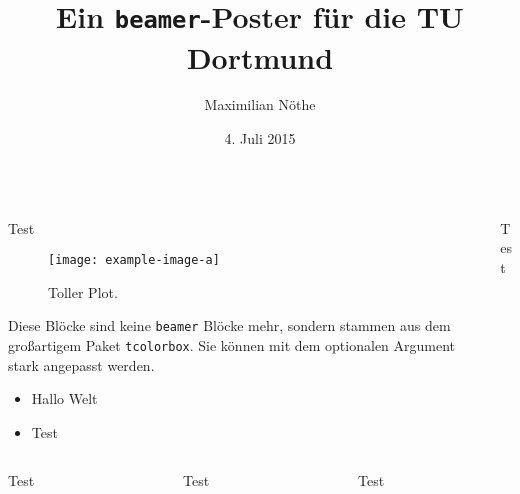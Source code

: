 \documentclass[t]{beamer}
\title{Ein \texttt{beamer}-Poster für die TU Dortmund}
\author{Maximilian Nöthe}
\date{4. Juli 2015}
\institute{%
  \texttt{[image: tudo.pdf]}%
}
\newlength{\thirdtextwidth}
\begin{document}
  \begin{columns}[onlytextwidth]%
    \begin{column}{0.5\textwidth}%
      \begin{block}[equal height group=A]{Test}%
        \begin{multicols}{2}
          \begin{figure}
            \texttt{[image: example-image-a]}\\
            \caption{Toller Plot.}
          \end{figure}
          \columnbreak
          Diese Blöcke sind keine \texttt{beamer} Blöcke mehr,
          sondern stammen aus dem großartigem Paket \texttt{tcolorbox}.
          Sie können mit dem optionalen Argument stark angepasst werden.
          \begin{itemize}
            \item Hallo Welt
            \item Test
          \end{itemize}
        \end{multicols}
      \end{block}%
    \end{column}%
    \begin{column}{0.5\textwidth}%
      \begin{alertblock}[equal height group=A]{Test}%
        \begin{multicols}{2}
          \blindtext
          \blindtext
        \end{multicols}
      \end{alertblock}%
    \end{column}%
  \end{columns}%
  \begin{columns}[c, onlytextwidth]%
    \begin{column}{\thirdtextwidth}%
      \begin{exampleblock}{Test}%
        \blindtext%
      \end{exampleblock}%
    \end{column}%
    \begin{column}{\thirdtextwidth}%
      \begin{block}{Test}%
        \blindtext%
      \end{block}%
    \end{column}%
    \begin{column}{\thirdtextwidth}%
      \begin{block}{Test}%
        \blindtext%
      \end{block}%
    \end{column}%
  \end{columns}%
\end{document}
